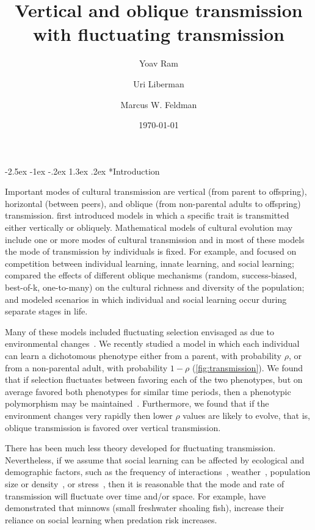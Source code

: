 \documentclass[11pt]{extarticle}
\title{Vertical and oblique transmission with fluctuating transmission}
\author[a]{Yoav Ram}
\author[b]{Uri Liberman}
\author[a]{Marcus W. Feldman}
\affil[a]{Department of Biology, Stanford University, Stanford, CA}
\affil[b]{School of Mathematical Sciences, Tel Aviv University, Israel}
\date{\today}
\makeatletter
\renewcommand\section{\@startsection {section}{1}{\z@}%
     {-2.5ex \@plus -1ex \@minus -.2ex}%
     {1.3ex \@plus.2ex}%
    {\Large\bfseries}}
\makeatother
\begin{document}
\maketitle


\section*{Introduction}

Important modes of cultural transmission are vertical (from parent to offspring), horizontal (between peers), and oblique (from non-parental adults to offspring) transmission. 
\citet[ch.~3]{Cavalli-Sforza1981} first introduced models in which a specific trait is transmitted either vertically or obliquely.
Mathematical models of cultural evolution may include one or more modes of cultural transmission and in most of these models the mode of transmission by individuals is fixed. 
For example, \cite{Aoki2005} and \citet{McElreath2008} focused on competition between individual learning, innate learning, and social learning; \citet{Fogarty2017} compared the effects of different oblique mechanisms (random, success-biased, best-of-k, one-to-many) on the cultural richness and diversity of the population; and \citet{Aoki2012} modeled scenarios in which individual and social learning occur during separate stages in life.

Many of these models included fluctuating selection envisaged as due to environmental changes~\citep[reviewed in][]{Aoki2014}. 
We recently studied a model in which each individual can learn a dichotomous phenotype either from a parent, with probability $\rho$, or from a non-parental adult, with probability $1-\rho$ (\autoref{fig:transmission}).
We found that if selection fluctuates between favoring each of the two phenotypes, but on average favored both phenotypes for similar time periods, then a phenotypic polymorphism may be maintained~\citep{Ram2018}.
Furthermore, we found that if the environment changes very rapidly then lower $\rho$ values are likely to evolve, that is, oblique transmission is favored over vertical transmission.

There has been much less theory developed for fluctuating transmission.
Nevertheless, if we assume that social learning can be affected by ecological and demographic factors, such as the frequency of interactions~\citep{VanSchaik2003}, weather~\citep{Phithakkitnukoon2012}, population size or density~\citep{Fischer2015,Aureli1997a}, or stress~\citep{Farine2015}, then it is reasonable that the mode and rate of transmission will fluctuate over time and/or space.
For example, \citet{Webster2008} have demonstrated that minnows (small freshwater shoaling fish), increase their reliance on social learning when predation risk increases.
\end{document}

